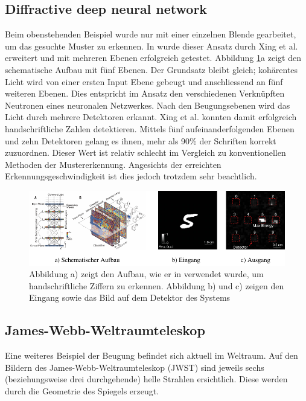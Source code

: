 \subsection{Diffractive deep neural network}
Beim obenstehenden Beispiel wurde nur mit einer einzelnen Blende gearbeitet, um das gesuchte Muster zu erkennen.
In \cite{opt:Lin.2018} wurde dieser Ansatz durch Xing et al. erweitert und mit mehreren Ebenen erfolgreich getestet.
Abbildung \ref{opt:fig:handwriting}a zeigt den schematische Aufbau mit fünf Ebenen.
Der Grundsatz bleibt gleich; kohärentes Licht wird von einer ersten Input Ebene gebeugt und anschliessend an fünf weiteren Ebenen.
Dies entspricht im Ansatz den verschiedenen Verknüpften Neutronen eines neuronalen Netzwerkes.
Nach den Beugungsebenen wird das Licht durch mehrere Detektoren erkannt.
Xing et al. konnten damit erfolgreich handschriftliche Zahlen detektieren.
Mittels fünf aufeinanderfolgenden Ebenen und zehn Detektoren gelang es ihnen, mehr als 90\% der Schriften korrekt zuzuordnen.
Dieser Wert ist relativ schlecht im Vergleich zu konventionellen Methoden der Mustererkennung.
Angesichts der erreichten Erkennungsgeschwindigkeit ist dies jedoch trotzdem sehr beachtlich.

\begin{figure}
    \centering
    \includegraphics[width=\textwidth]{papers/opt/images/handwriting.pdf}
    \caption{Abbildung a) zeigt den Aufbau, wie er in \cite{opt:Lin.2018} verwendet wurde, um handschriftliche Ziffern zu erkennen.
    Abbildung b) und c) zeigen den Eingang sowie das Bild auf dem Detektor des Systems}
    \label{opt:fig:handwriting}
\end{figure}

\subsection{James-Webb-Weltraumteleskop}
Eine weiteres Beispiel der Beugung befindet sich aktuell im Weltraum.
Auf den Bildern des James-Webb-Weltraumteleskop (JWST) sind jeweils sechs (beziehungsweise drei durchgehende) helle Strahlen ersichtlich.
Diese werden durch die Geometrie des Spiegels erzeugt.


